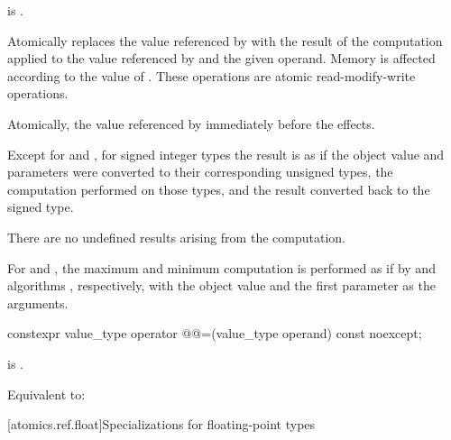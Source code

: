 \begin{itemdescr}
\pnum
\constraints
{} is .

\pnum
\effects
Atomically replaces the value referenced by  with
the result of the computation applied to the value referenced by 
and the given operand.
Memory is affected according to the value of .
These operations are atomic read-modify-write operations.

\pnum
\returns
Atomically, the value referenced by 
immediately before the effects.

\pnum
{}%
\remarks
Except for  and , for signed integer types
the result is as if the object value and parameters
were converted to their corresponding unsigned types,
the computation performed on those types, and
the result converted back to the signed type.
\begin{note}
There are no undefined results arising from the computation.
\end{note}

\pnum
For  and , the maximum and minimum
computation is performed as if by  and  algorithms
, respectively, with the object value and the first
parameter as the arguments.
\end{itemdescr}

%
%
%
%
%
\begin{itemdecl}
constexpr value_type operator @@=(value_type operand) const noexcept;
\end{itemdecl}

\begin{itemdescr}
\pnum
\constraints
{} is .

\pnum
\effects
Equivalent to:
\end{itemdescr}

[atomics.ref.float]{Specializations for floating-point types}

